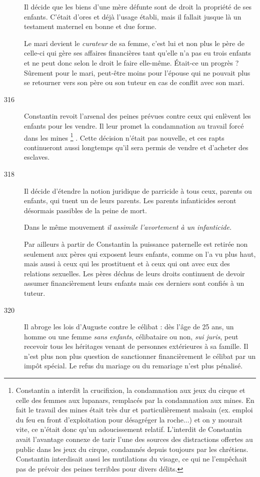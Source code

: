 \begin{description}
Il décide que les biens d'une mère défunte sont de droit la propriété de ses enfants. C'était d'ores et déjà l'usage établi, mais il fallait jusque là un testament maternel en bonne et due forme.

Le mari devient le \emph{curateur} de sa femme, c'est lui et non plus le père de celle-ci qui gère ses affaires financières tant qu'elle n'a pas eu trois enfants et ne peut donc selon le droit le faire elle-même. Était-ce un progrès ? Sûrement pour le mari, peut-être moins pour l'épouse qui ne pouvait plus se retourner vers son père ou son tuteur en cas de conflit avec son mari.

\item[316] Constantin revoit l'arsenal des peines prévues contre ceux qui enlèvent les enfants pour les vendre. Il leur promet la condamnation au travail forcé dans les mines%
\footnote{Constantin a interdit la crucifixion, la condamnation aux jeux du cirque et celle des femmes aux lupanars, remplacés par la condamnation aux mines. En fait le travail des mines était très dur et particulièrement malsain (ex. emploi du feu en front d'exploitation pour désagréger la roche...) et on y mourait vite, ce n'était donc qu'un adoucissement relatif. L'interdit de Constantin avait l'avantage connexe de tarir l'une des sources des distractions offertes au public dans les jeux du cirque, condamnés depuis toujours par les chrétiens. Constantin interdisait aussi les mutilations du visage, ce qui ne l'empêchait pas de prévoir des peines terribles pour divers délits.}%
. Cette décision n'était pas nouvelle, et ces rapts continueront aussi longtemps qu'il sera permis de vendre et d'acheter des esclaves.

\item[318] Il décide d'étendre la notion juridique de parricide à tous ceux, parents ou enfants, qui tuent un de leurs parents. Les parents infanticides seront désormais passibles de la peine de mort. 

 Dans le même mouvement \emph{il assimile l'avortement à un infanticide.}

 Par ailleurs à partir de Constantin la puissance paternelle est retirée non seulement aux pères qui exposent leurs enfants, comme on l'a vu plus haut, mais aussi à ceux qui les prostituent et à ceux qui ont avec eux des relations sexuelles. Les pères déchus de leurs droits continuent de devoir assumer financièrement leurs enfants mais ces derniers sont confiés à un tuteur.

\item[320] Il abroge les lois d'Auguste contre le célibat : dès l'âge de 25 ans, un homme ou une femme \emph{sans enfants}, célibataire ou non, \emph{sui juris}, peut recevoir tous les héritages venant de personnes extérieures à sa famille. Il n'est plus non plus question de sanctionner financièrement le célibat par un impôt spécial. Le refus du mariage ou du remariage n'est plus pénalisé.


\end{description}
